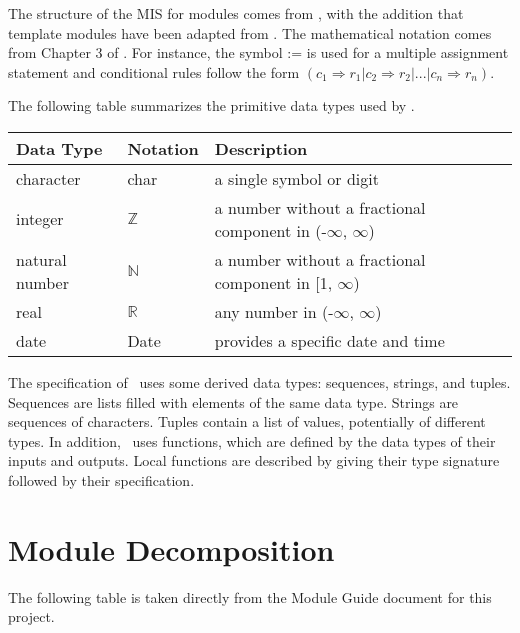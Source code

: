 \documentclass[12pt, titlepage]{article}
\begin{document}

The structure of the MIS for modules comes from \citet{HoffmanAndStrooper1995},
with the addition that template modules have been adapted from
\cite{GhezziEtAl2003}.  The mathematical notation comes from Chapter 3 of
\citet{HoffmanAndStrooper1995}.  For instance, the symbol := is used for a
multiple assignment statement and conditional rules follow the form $(c_1
\Rightarrow r_1 | c_2 \Rightarrow r_2 | ... | c_n \Rightarrow r_n )$.

The following table summarizes the primitive data types used by \progname. 

\begin{center}
\renewcommand{\arraystretch}{1.2}
\noindent 
\begin{tabular}{l l p{7.5cm}} 
\toprule 
\textbf{Data Type} & \textbf{Notation} & \textbf{Description}\\ 
\midrule
character & char & a single symbol or digit\\
integer & $\mathbb{Z}$ & a number without a fractional component in (-$\infty$, $\infty$) \\
natural number & $\mathbb{N}$ & a number without a fractional component in [1, $\infty$) \\
real & $\mathbb{R}$ & any number in (-$\infty$, $\infty$)\\
date & Date & provides a specific date and time\\
\bottomrule
\end{tabular} 
\end{center}

\noindent
The specification of \progname \ uses some derived data types: sequences, strings, and
tuples. Sequences are lists filled with elements of the same data type. Strings
are sequences of characters. Tuples contain a list of values, potentially of
different types. In addition, \progname \ uses functions, which
are defined by the data types of their inputs and outputs. Local functions are
described by giving their type signature followed by their specification.

\section{Module Decomposition}

The following table is taken directly from the Module Guide document for this project.
\end{document}
